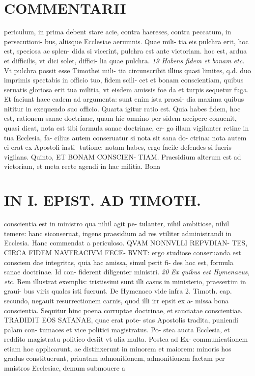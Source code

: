 \documentclass{article}
\begin{document}
\begin{pages}
\section*{COMMENTARII }
\marginpar{[ p.40 ]}\pstart periculum, in prima debent stare acie, contra haereses, contra peccatum, in persecutioni- bus, aliisque Ecclesiae aerumnis. Quae mili- tia eis pulchra erit, hoc est, speciosa ac splen- dida si vicerint, pulchra est ante victoriam. hoc est, ardua et difficilis, vt dici solet, diffici- lia quae pulchra.  \pend
\textit{19 Habens fidem et bonam etc. }\pstart Vt pulchra possit esse Timothei mili- tia circunscribit illius quasi limites, q.d. duo imprimis spectabis in officio tuo, fidem scili- cet et bonam conscientiam, quibus seruatis gloriosa erit tua militia, vt eisdem amissis foe da et turpis sequetur fuga. Et faciunt haec eadem ad argumenta: sunt enim ista praesi- dia maxima quibus nititur in exequendo suo officio.  \pend\pstart Quarta igitur ratio est. Quia habes fidem, hoc est, rationem sanae doctrinae, quam hic omnino per sidem accipere conuenit, quasi dicat, nota est tibi formula sanae doctrinae, er- go illam vigilanter retine in tua Ecclesia, fa- cilius autem conseruatur si nota sit sana do- ctrina: nota autem ei erat ex Apostoli insti- tutione: notam habes, ergo facile defendes si fueris vigilans.  \pend\pstart Quinto, ET BONAM CONSCIEN- TIAM. Praesidium alterum est ad victoriam, et meta recte agendi in hac militia. Bona  \pend
\section*{IN I. EPIST. AD TIMOTH. }
\marginpar{[ p.41 ]}\pstart conscientia est in ministro qua nihil agit pe- tulanter, nihil ambitiose, nihil temere: hanc siconseruat, ingens praesidium ad res vtiliter administrandi in Ecclesia. Hanc commendat a periculoso. QVAM NONNVLLI REPVDIAN- TES, CIRCA FIDEM NAVFRACIVM FECE- RVNT: ergo studiose conseruanda est consciem dae integritas, quia hac amissa, simul perit fi- des hoc est, formula sanae doctrinae. Id con- fiderent diligenter ministri.  \pend
\textit{20 Ex quibus est Hymenaeus, etc. }\pstart Rem illustrat exemplis: tristissimi sunt illi casus in ministerio, praesertim in graui- bus viris quales isti fuerunt. De Hymenaeo vide infra 2. Timoth. cap. secundo, negauit resurrectionem carnis, quod illi irr epsit ex a- missa bona conscientia. Sequitur hinc poena corruptae doctrinae, et sauciatae conscientiae. TRADIDIT EOS SATANAE, quae erat pote- stas Apostolis tradita, puniendi palam con- tumaces et vice politici magistratus. Po- stea aucta Ecclesia, et reddito magistratu politico desiit vt alia multa. Postea ad Ex- communicationem etiam hoc applicarunt, ae distinxerunt in minorem et maiorem: minoris hos gradus constituerunt, priuatam admonitionem, admonitionem factam per mnistros Ecclesiae, demum submouere a  \pend

\end{pages}
\end{document}
